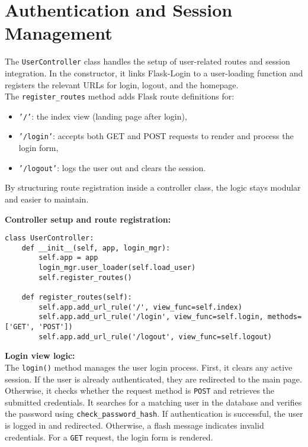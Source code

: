 \documentclass[12pt]{article}
\begin{document}
\section{Authentication and Session Management}

The \texttt{UserController} class handles the setup of user-related routes and session integration. In the constructor, it links Flask-Login to a user-loading function and registers the relevant URLs for login, logout, and the homepage.\\

The \texttt{register\_routes} method adds Flask route definitions for:
\begin{itemize}
  \item \texttt{'/'}: the index view (landing page after login),
  \item \texttt{'/login'}: accepts both GET and POST requests to render and process the login form,
  \item \texttt{'/logout'}: logs the user out and clears the session.
\end{itemize}

\noindent By structuring route registration inside a controller class, the logic stays modular and easier to maintain.
\newpage

\noindent \textbf{Controller setup and route registration:} \\
\begin{verbatim}
class UserController:
    def __init__(self, app, login_mgr):
        self.app = app
        login_mgr.user_loader(self.load_user)
        self.register_routes()

    def register_routes(self):
        self.app.add_url_rule('/', view_func=self.index)
        self.app.add_url_rule('/login', view_func=self.login, methods=['GET', 'POST'])
        self.app.add_url_rule('/logout', view_func=self.logout)
\end{verbatim} 
\vspace{1em}
\noindent \textbf{Login view logic:} \\

\noindent The \texttt{login()} method manages the user login process. First, it clears any active session. If the user is already authenticated, they are redirected to the main page. Otherwise, it checks whether the request method is \texttt{POST} and retrieves the submitted credentials. It searches for a matching user in the database and verifies the password using \texttt{check\_password\_hash}. If authentication is successful, the user is logged in and redirected. Otherwise, a flash message indicates invalid credentials. For a \texttt{GET} request, the login form is rendered. 
\end{document}
